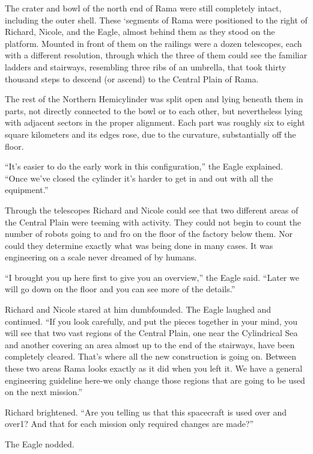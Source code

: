 \documentclass[]{article}
\begin{document}
{The crater and bowl of the north end of Rama were still completely intact, including the outer shell. These ‘segments of Rama were positioned to the right of Richard, Nicole, and the Eagle, almost behind them as they stood on the platform. Mounted in front of them on the railings were a dozen telescopes, each with a different resolution, through which the three of them could see the familiar ladders and stairways, resembling three ribs of an umbrella, that took thirty thousand steps to descend (or ascend) to the Central Plain of Rama.

The rest of the Northern Hemicylinder was split open and lying beneath them in parts, not directly connected to the bowl or to each other, but nevertheless lying with adjacent sectors in the proper alignment. Each part was roughly six to eight square kilometers and its edges rose, due to the curvature, substantially off the floor.

“It’s easier to do the early work in this configuration,” the Eagle explained. “Once we’ve closed the cylinder it’s harder to get in and out with all the equipment.”

Through the telescopes Richard and Nicole could see that two different areas of the Central Plain were teeming with activity. They could not begin to count the number of robots going to and fro on the floor of the factory below them. Nor could they determine exactly what was being done in many cases. It was engineering on a scale never dreamed of by humans.

“I brought you up here first to give you an overview,” the Eagle said. “Later we will go down on the floor and you can see more of the details.”

Richard and Nicole stared at him dumbfounded. The Eagle laughed and continued. “If you look carefully, and put the pieces together in your mind, you will see that two vast regions of the Central Plain, one near the Cylindrical Sea and another covering an area almost up to the end of the stairways, have been completely cleared. That’s where all the new construction is going on. Between these two areas Rama looks exactly as it did when you left it. We have a general engineering guideline here-we only change those regions that are going to be used on the next mission.”

Richard brightened. “Are you telling us that this spacecraft is used over and over1? And that for each mission only required changes are made?”

The Eagle nodded.

}
\end{document}
